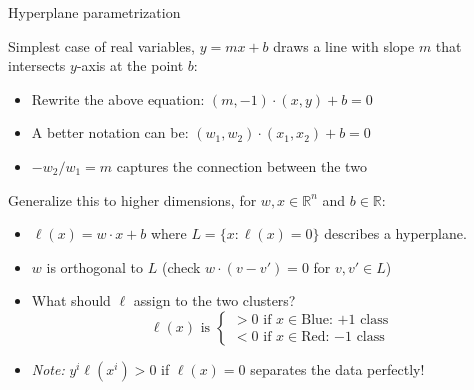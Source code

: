 \documentclass{beamer}
\begin{document}
\begin{frame}{Hyperplane parametrization}

Simplest case of real variables, $y = mx + b$ draws a line with slope $m$ that intersects $y$-axis at the point $b$:

\begin{itemize}
    \item Rewrite the above equation: $(m, -1) \cdot (x, y) + b = 0$
    \item A better notation can be: $(w_1, w_2) \cdot (x_1, x_2) + b = 0$ \item $-w_2/w_1 = m$ captures the connection between the two
\end{itemize}
\pause
Generalize this to higher dimensions, for $w, x \in \mathbb{R}^n$ and $b \in \mathbb{R}$:
\begin{itemize}
    \item $ \ell(x) = w\cdot x + b$ where $L=\{x:\ell(x) = 0\}$ describes a hyperplane.
    \item $w$ is orthogonal to $L$ (check $w\cdot (v-v') = 0$ for $v,v'\in L$)
    \item What should $\ell$ assign to the two clusters?
        \[
        \ell(x) \text{ is } 
        \begin{cases}
        > 0 \text{ if } x \in \text{Blue: $+1$ class} \\
        < 0 \text{ if } x \in \text{Red: $-1$ class}
        \end{cases}
        \]
    \item \textit{Note:} $y^i\ell(x^i) > 0$ if $\ell(x)=0$ separates the data perfectly! 
\end{itemize}
    
\end{frame}

\end{document}
